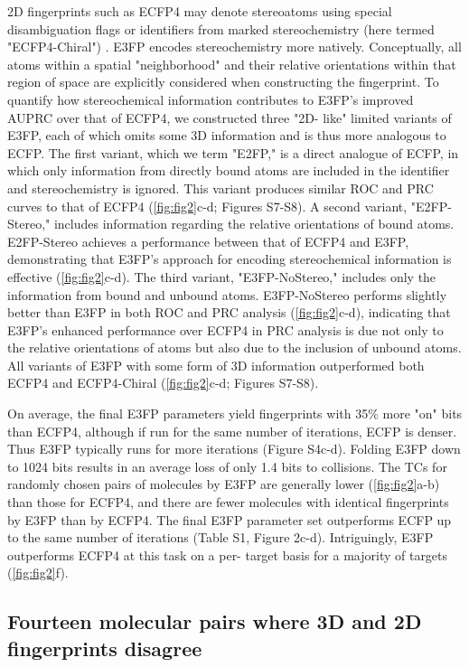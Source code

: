 \documentclass[../main.tex]{subfiles}
\begin{document}
\begin{refsection}
2D fingerprints such as ECFP4 may denote stereoatoms using special disambiguation flags or identifiers from marked stereochemistry (here termed "ECFP4-Chiral") \cite{rogers_2010}.
E3FP encodes stereochemistry more natively.
Conceptually, all atoms within a spatial "neighborhood" and their relative orientations within that region of space are explicitly considered when constructing the fingerprint.
To quantify how stereochemical information contributes to E3FP's improved AUPRC over that of ECFP4, we constructed three "2D- like" limited variants of E3FP, each of which omits some 3D information and is thus more analogous to ECFP.
The first variant, which we term "E2FP," is a direct analogue of ECFP, in which only information from directly bound atoms are included in the identifier and stereochemistry is ignored.
This variant produces similar ROC and PRC curves to that of ECFP4 (\cref{fig:fig2}c-d; Figures S7-S8).
A second variant, "E2FP-Stereo," includes information regarding the relative orientations of bound atoms.
E2FP-Stereo achieves a performance between that of ECFP4 and E3FP, demonstrating that E3FP's approach for encoding stereochemical information is effective (\cref{fig:fig2}c-d).
The third variant, "E3FP-NoStereo," includes only the information from bound and unbound atoms.
E3FP-NoStereo performs slightly better than E3FP in both ROC and PRC analysis (\cref{fig:fig2}c-d), indicating that E3FP's enhanced performance over ECFP4 in PRC analysis is due not only to the relative orientations of atoms but also due to the inclusion of unbound atoms.
All variants of E3FP with some form of 3D information outperformed both ECFP4 and ECFP4-Chiral (\cref{fig:fig2}c-d; Figures S7-S8).

On average, the final E3FP parameters yield fingerprints with 35\% more "on" bits than ECFP4, although if run for the same number of iterations, ECFP is denser.
Thus E3FP typically runs for more iterations (Figure S4c-d).
Folding E3FP down to 1024 bits results in an average loss of only 1.4 bits to collisions.
The TCs for randomly chosen pairs of molecules by E3FP are generally lower (\cref{fig:fig2}a-b) than those for ECFP4, and there are fewer molecules with identical fingerprints by E3FP than by ECFP4.
The final E3FP parameter set outperforms ECFP up to the same number of iterations (Table S1, Figure 2c-d).
Intriguingly, E3FP outperforms ECFP4 at this task on a per- target basis for a majority of targets (\cref{fig:fig2}f).

\subsection*{Fourteen molecular pairs where 3D and 2D fingerprints disagree}


\end{refsection}
\end{document}
